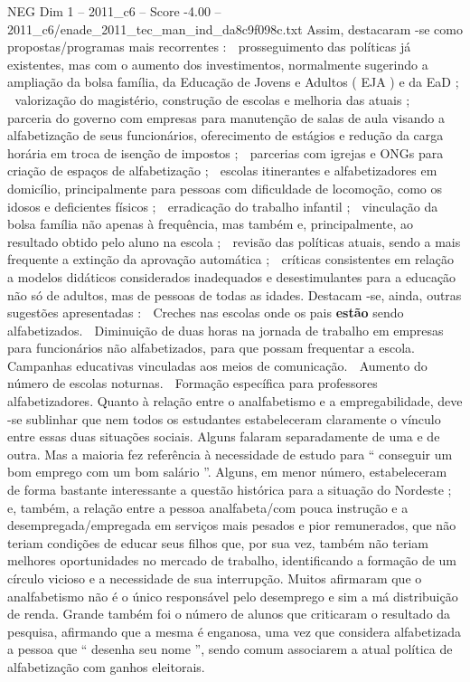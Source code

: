 \begin{textsample}{NEG Dim 1 – 2011\_c6 – Score -4.00 – 2011\_c6/enade\_2011\_tec\_man\_ind\_da8c9f098c.txt}
Assim, destacaram -se como propostas/programas mais recorrentes :  prosseguimento das políticas já existentes, mas com o aumento dos investimentos, normalmente sugerindo a ampliação da bolsa família, da Educação de Jovens e Adultos ( EJA ) e da EaD ;  valorização do magistério, construção de escolas e melhoria das atuais ;  parceria do governo com empresas para manutenção de salas de aula visando a alfabetização de seus funcionários, oferecimento de estágios e redução da carga horária em troca de isenção de impostos ;  parcerias com igrejas e ONGs para criação de espaços de alfabetização ;  escolas itinerantes e alfabetizadores em domicílio, principalmente para pessoas com dificuldade de locomoção, como os idosos e deficientes físicos ;  erradicação do trabalho infantil ;  vinculação da bolsa família não apenas à frequência, mas também e, principalmente, ao resultado obtido pelo aluno na escola ;  revisão das políticas atuais, sendo a mais frequente a extinção da aprovação automática ;  críticas consistentes em relação a modelos didáticos considerados inadequados e desestimulantes para a educação não só de adultos, mas de pessoas de todas as idades.
Destacam -se, ainda, outras sugestões apresentadas :  Creches nas escolas onde os pais \textbf{estão} sendo alfabetizados.  Diminuição de duas horas na jornada de trabalho em empresas para funcionários não alfabetizados, para que possam frequentar a escola.  Campanhas educativas vinculadas aos meios de comunicação.  Aumento do número de escolas noturnas.  Formação específica para professores alfabetizadores.
Quanto à relação entre o analfabetismo e a empregabilidade, deve -se sublinhar que nem todos os estudantes estabeleceram claramente o vínculo entre essas duas situações sociais.
Alguns falaram separadamente de uma e de outra.
Mas a maioria fez referência à necessidade de estudo para “ conseguir um bom emprego com um bom salário ”.
Alguns, em menor número, estabeleceram de forma bastante interessante a questão histórica para a situação do Nordeste ; e, também, a relação entre a pessoa analfabeta/com pouca instrução e a desempregada/empregada em serviços mais pesados e pior remunerados, que não teriam condições de educar seus filhos que, por sua vez, também não teriam melhores oportunidades no mercado de trabalho, identificando a formação de um círculo vicioso e a necessidade de sua interrupção.
Muitos afirmaram que o analfabetismo não é o único responsável pelo desemprego e sim a má distribuição de renda.
Grande também foi o número de alunos que criticaram o resultado da pesquisa, afirmando que a mesma é enganosa, uma vez que considera alfabetizada a pessoa que “ desenha seu nome ”, sendo comum associarem a atual política de alfabetização com ganhos eleitorais.

\end{textsample}
